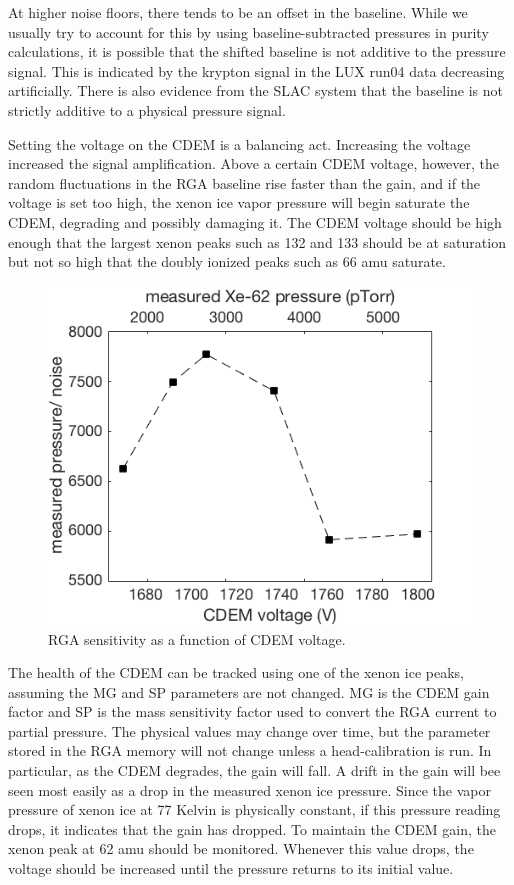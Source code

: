 \documentclass[12pt]{article}
\begin{document}
{\color{red}At higher noise floors, there tends to be an offset in the baseline. While we usually try to account for this by using baseline-subtracted pressures in purity calculations, it is possible that the shifted baseline is not additive to the pressure signal. This is indicated by the krypton signal in the LUX run04 data decreasing artificially. There is also evidence from the SLAC system that the baseline is not strictly additive to a physical pressure signal.}

Setting the voltage on the CDEM is a balancing act. Increasing the voltage increased the signal amplification. Above a certain CDEM voltage, however, the random fluctuations in the RGA baseline rise faster than the gain, and if the voltage is set too high, the xenon ice vapor pressure will begin saturate the CDEM, degrading and possibly damaging it. The CDEM voltage should be high enough that the largest xenon peaks such as 132 and 133 should be at saturation but not so high that the doubly ionized peaks such as 66 amu saturate. 

\begin{figure}[h]
  \includegraphics[width=\linewidth]{Figures/CDEM_gain_noise.png}
  \caption{RGA sensitivity as a function of CDEM voltage. }
  \label{fig:CTpid}
\end{figure}

The health of the CDEM can be tracked using one of the xenon ice peaks, assuming the MG and SP parameters are not changed. MG is the CDEM gain factor and SP is the mass sensitivity factor used to convert the RGA current to partial pressure. The physical values may change over time, but the parameter stored in the RGA memory will not change unless a head-calibration is run. In particular, as the CDEM degrades, the gain will fall. A drift in the gain will bee seen most easily as a drop in the measured xenon ice pressure. Since the vapor pressure of xenon ice at 77 Kelvin is physically constant, if this pressure reading drops, it indicates that the gain has dropped. To maintain the CDEM gain, the xenon peak at 62 amu should be monitored. Whenever this value drops, the voltage should be increased until the pressure returns to its initial value.
\end{document}
